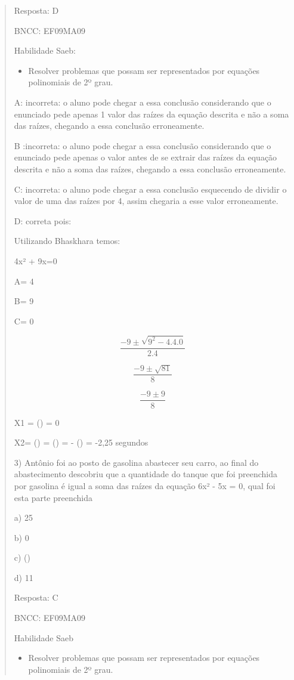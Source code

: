 \begin{quote}
\begin{escolha}
Resposta: D

BNCC: EF09MA09

Habilidade Saeb:

\begin{itemize}
\tightlist
\item
  Resolver problemas que possam ser representados por equações
  polinomiais de 2º grau.
\end{itemize}

A: incorreta: o aluno pode chegar a essa conclusão considerando que o
enunciado pede apenas 1 valor das raízes da equação descrita e não a
soma das raízes, chegando a essa conclusão erroneamente.

B :incorreta: o aluno pode chegar a essa conclusão considerando que o
enunciado pede apenas o valor antes de se extrair das raízes da equação
descrita e não a soma das raízes, chegando a essa conclusão
erroneamente.

C: incorreta: o aluno pode chegar a essa conclusão esquecendo de dividir
o valor de uma das raízes por 4, assim chegaria a esse valor
erroneamente.

D: correta pois:

Utilizando Bhaskhara temos:

4x² + 9x=0

A= 4

B= 9

C= 0

\[\frac{- 9 \pm \sqrt{9^{2} - 4.4.0}}{2.4}\]

\[\frac{- 9 \pm \sqrt{81}}{8}\]

\[\frac{- 9 \pm 9}{8}\]

X1 = () = 0

X2= () = () = - () =
-2,25 segundos

3) Antônio foi ao posto de gasolina abastecer seu carro, ao final do
abastecimento descobriu que a quantidade do tanque que foi preenchida
por gasolina é igual a soma das raízes da equação 6x² - 5x = 0, qual foi
esta parte preenchida

a) 25

b) 0

c) ()

d) 11

Resposta: C

BNCC: EF09MA09

Habilidade Saeb

\begin{itemize}
\tightlist
\item
  Resolver problemas que possam ser representados por equações
  polinomiais de 2º grau.
\end{itemize}


\end{escolha}
\end{quote}
